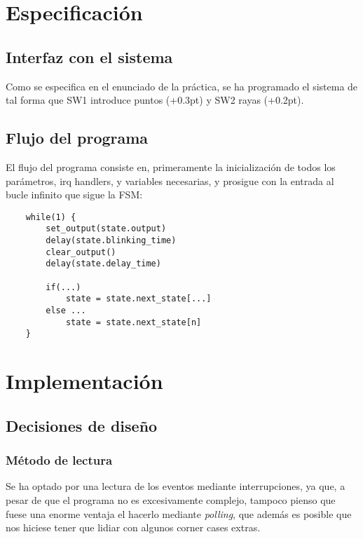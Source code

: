 \documentclass[a4paper,openright,12pt]{article}
\newcommand{\punto}{\kern+0.3pt\raisebox{0.35ex}{\huge\textbf.}}
\newcommand{\raya}{\kern+0.2pt\raisebox{-0.35ex}{\huge\textbf-}}
\begin{document}
\clearpage
\section{Especificación}
\subsection{Interfaz con el sistema}\label{design_button_translation}
Como se especifica en el enunciado de la práctica, se ha programado el sistema de tal forma que SW1 introduce puntos (\punto) y SW2 rayas (\raya).

\subsection{Flujo del programa}
El flujo del programa consiste en, primeramente la inicialización de todos los parámetros, irq handlers, y variables necesarias, y prosigue con la entrada al bucle infinito que sigue la FSM:
\begin{verbatim}
    while(1) {
        set_output(state.output)
        delay(state.blinking_time)
        clear_output()
        delay(state.delay_time)
        
        if(...)
            state = state.next_state[...]
        else ...
            state = state.next_state[n]
    }
\end{verbatim}


\clearpage
\section{Implementación}
\subsection{Decisiones de diseño}
\subsubsection{Método de lectura}\label{reading_method}
Se ha optado por una lectura de los eventos mediante interrupciones, ya que, a pesar de que el programa no es excesivamente complejo, tampoco pienso que fuese una enorme ventaja el
hacerlo mediante \emph{polling}, que además es posible que nos hiciese tener que lidiar con algunos corner cases extras.
\end{document}
